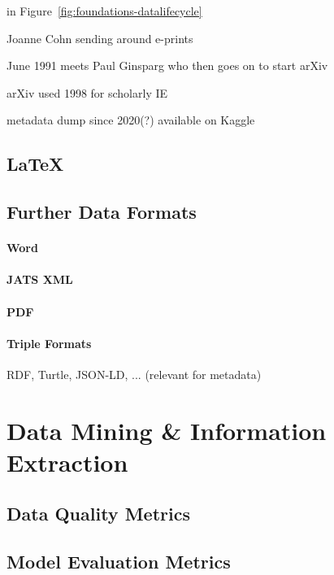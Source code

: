 in Figure~\ref{fig:foundations-datalifecycle}

Joanne Cohn sending around e-prints~\cite{Feder2021,Turner2012}

June 1991 meets Paul Ginsparg who then goes on to start arXiv~\cite{Ginsparg2011a,Ginsparg2011}

arXiv used 1998 for scholarly IE~\cite{Nanba1998}

metadata dump since 2020(?) available on Kaggle~\cite{arxiv_kaggle_dataset}

\subsection{\LaTeX}

\subsection{Further Data Formats}

\paragraph{Word}

\paragraph{JATS XML}

\paragraph{PDF}

\paragraph{Triple Formats}
RDF, Turtle, JSON-LD, ... (relevant for metadata)



\section{Data Mining \& Information Extraction}


\subsection{Data Quality Metrics}

\subsection{Model Evaluation Metrics}
